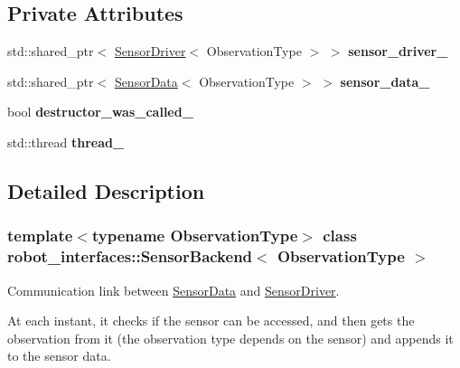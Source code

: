 \subsection*{Private Attributes}
\begin{DoxyCompactItemize}
\item 
\mbox{\label{classrobot__interfaces_1_1SensorBackend_a72fda090e697edcda5f92d7542788171}} 
std\+::shared\+\_\+ptr$<$ \hyperlink{classrobot__interfaces_1_1SensorDriver}{Sensor\+Driver}$<$ Observation\+Type $>$ $>$ {\bfseries sensor\+\_\+driver\+\_\+}
\item 
\mbox{\label{classrobot__interfaces_1_1SensorBackend_a93c993a56270f282235df08337e0bc26}} 
std\+::shared\+\_\+ptr$<$ \hyperlink{classrobot__interfaces_1_1SensorData}{Sensor\+Data}$<$ Observation\+Type $>$ $>$ {\bfseries sensor\+\_\+data\+\_\+}
\item 
\mbox{\label{classrobot__interfaces_1_1SensorBackend_a479d96dc0a9fce6c72c7957e005530f7}} 
bool {\bfseries destructor\+\_\+was\+\_\+called\+\_\+}
\item 
\mbox{\label{classrobot__interfaces_1_1SensorBackend_ac9ca3c3602264de39a6bca792b51dcd4}} 
std\+::thread {\bfseries thread\+\_\+}
\end{DoxyCompactItemize}


\subsection{Detailed Description}
\subsubsection*{template$<$typename Observation\+Type$>$\newline
class robot\+\_\+interfaces\+::\+Sensor\+Backend$<$ Observation\+Type $>$}

Communication link between \hyperlink{classrobot__interfaces_1_1SensorData}{Sensor\+Data} and \hyperlink{classrobot__interfaces_1_1SensorDriver}{Sensor\+Driver}. 

At each instant, it checks if the sensor can be accessed, and then gets the observation from it (the observation type depends on the sensor) and appends it to the sensor data.


